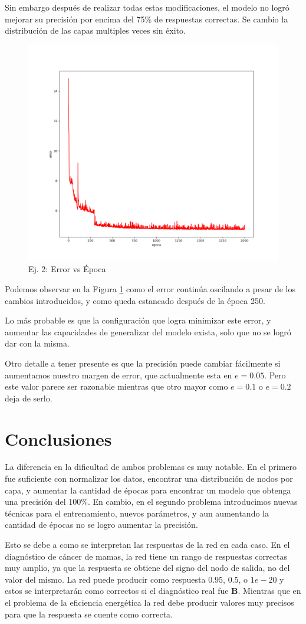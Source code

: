 \documentclass[a4paper,10pt]{article}
\begin{document}
Sin embargo después de realizar todas estas modificaciones, el modelo no logró
mejorar su precisión por encima del 75\% de respuestas correctas. Se cambio
la distribución de las capas multiples veces sin éxito.

\begin{figure}
\centering
\includegraphics[width=.75\textwidth]{ej2-error_vs_epoca}
\caption{Ej. 2: Error vs Época}
\label{fig:ej2-e_vs_t}
\end{figure}

Podemos observar en la Figura \ref{fig:ej2-e_vs_t} como el error continúa
oscilando a pesar de los cambios introducidos, y como queda estancado después
de la época 250.

Lo más probable es que la configuración que logra minimizar este error, y
aumentar las capacidades de generalizar del modelo exista, solo que no se
logró dar con la misma.

Otro detalle a tener presente es que la precisión puede cambiar fácilmente si
aumentamos nuestro margen de error, que actualmente esta en $e=0.05$. Pero
este valor parece ser razonable mientras que otro mayor como $e=0.1$ o $e=0.2$
deja de serlo.

\section{Conclusiones}

La diferencia en la dificultad de ambos problemas es muy notable. En el
primero fue suficiente con normalizar los datos, encontrar una distribución de
nodos por capa, y aumentar la cantidad de épocas para encontrar un modelo que
obtenga una precisión del 100\%. En cambio, en el segundo problema
introducimos nuevas técnicas para el entrenamiento, nuevos parámetros, y aun
aumentando la cantidad de épocas no se logro aumentar la precisión.

Esto se debe a como se interpretan las respuestas de la red en cada caso. En
el diagnóstico de cáncer de mamas, la red tiene un rango de respuestas
correctas muy amplio, ya que la respuesta se obtiene del signo del nodo de
salida, no del valor del mismo. La red puede producir como respuesta $0.95$,
$0.5$, o $1e-20$ y estos se interpretarán como correctos si el diagnóstico
real fue \textbf{B}. Mientras que en el problema de la eficiencia energética
la red debe producir valores muy precisos para que la respuesta se cuente como
correcta.
\end{document}
